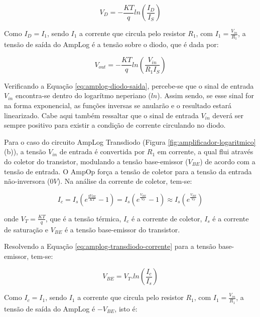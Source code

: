 \documentclass[a4paper]{instrumentacao}
\begin{document}
\begin{equation}
	V_D= -\frac{KT}{q} ln\left ( \frac{I_D}{I_S} \right )
	\label{eq:tensao-diodo}
\end{equation}

Como $I_D=I_1$, sendo $I_1$ a corrente que circula pelo resistor $R_1$, com $I_1=\frac{V_{in}}{R_1}$, a tensão de saída do AmpLog é a tensão sobre o diodo, que é dada por:

\begin{equation}
	V_{out}= -\frac{KT}{q} ln\left ( \frac{V_{in}}{R_1 I_S} \right )
	\label{eq:amplog-diodo-saida}
\end{equation}

Verificando a Equação \ref{eq:amplog-diodo-saida}, percebe-se que o sinal de entrada $V_{in}$ encontra-se dentro do logarítmo neperiano ($ln$). Assim sendo, se esse sinal for na forma exponencial, as funções inversas se anularão e o resultado estará linearizado. Cabe aqui também ressaltar que o sinal de entrada $V_{in}$ deverá ser sempre positivo para existir a condição de corrente circulando no diodo.

Para o caso do circuito AmpLog Transdiodo (Figura \ref{fig:amplificador-logaritmico} (b)), a tensão $V_{in}$ de entrada é convertida por $R_1$ em corrente, a qual flui através do coletor do transistor, modulando a tensão base-emissor ($V_{BE}$) de acordo com a tensão de entrada. O AmpOp força a tensão de coletor para a tensão da entrada não-inversora ($0V$). Na análise da corrente de coletor, tem-se:

\begin{equation}
	I_c=I_s(e^{\frac{q V_{BE}}{KT}}-1)=I_s(e^{\frac{V_{BE}}{V_T}}-1)\approx I_s(e^{\frac{V_{BE}}{V_T}})
	\label{eq:amplog-transdiodo-corrente}
\end{equation}

\noindent
onde $V_T=\frac{KT}{q}$, que é a tensão térmica, $I_c$ é a corrente de coletor, $I_s$ é a corrente de saturação e $V_{BE}$ é a tensão base-emissor do transistor.

Resolvendo a Equação \ref{eq:amplog-transdiodo-corrente} para a tensão base-emissor, tem-se:

\begin{equation}
	V_{BE}=V_T.ln \left ( \frac{I_c}{I_s} \right )
	\label{eq:amplog-transdiodo-tensao}
\end{equation}

Como $I_c=I_1$, sendo $I_1$ a corrente que circula pelo resistor $R_1$, com $I_1=\frac{V_{in}}{R_1}$, a tensão de saída do AmpLog é $-V_{BE}$, isto é:
\end{document}

